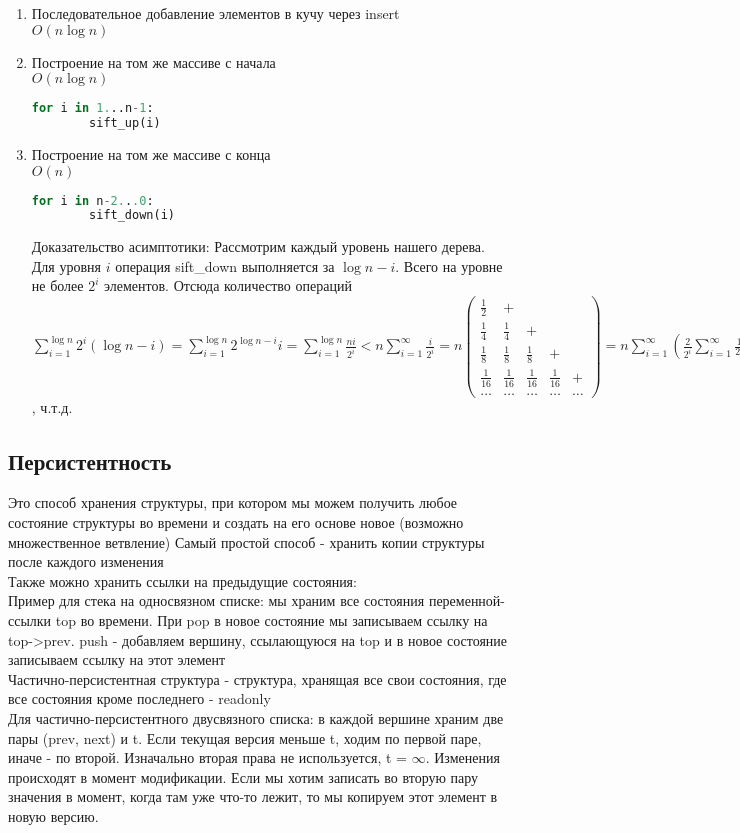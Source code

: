 \documentclass[12pt]{article}
\begin{document}
\begin{enumerate}
    \item Последовательное добавление элементов в кучу через insert\\
    $O(n\log n)$
    \item Построение на том же массиве с начала\\
    $O(n\log n)$
\begin{lstlisting}[language=Python]
    for i in 1...n-1:
        sift_up(i)
\end{lstlisting}
    \item Построение на том же массиве с конца\\
    $O(n)$
\begin{lstlisting}[language=Python]
    for i in n-2...0:
        sift_down(i)
\end{lstlisting}
Доказательство асимптотики:
Рассмотрим каждый уровень нашего дерева. Для уровня $i$ операция sift\_down выполняется за $\log n-i$. Всего на уровне не более $2^i$ элементов. Отсюда количество операций $\sum\limits_{i=1}^{\log n} 2^i(\log n - i) = \sum\limits_{i=1}^{\log n} 2^{\log n - i}i = \sum\limits_{i=1}^{\log n} \frac{ni}{2^i} < n\sum\limits_{i=1}^\infty \frac{i}{2^i} = n\left(\begin{array}{ccccc}
    \frac12 & + & & & \\
    \frac14 & \frac14 & + & & \\
    \frac18 & \frac18 & \frac18 & + & \\
    \frac1{16} & \frac1{16} & \frac1{16} & \frac1{16} & + \\
    \ldots & \ldots & \ldots & \ldots & \ldots
\end{array}\right) = n\sum\limits_{i=1}^\infty (\frac{2}{2^i} \sum\limits_{i=1}^\infty \frac1{2_i}) = n\sum\limits_{i=1}^\infty \frac{2}{2^i}\cdot 1 = 2n\cdot1$, ч.т.д.

\end{enumerate}
\subsection{Персистентность}
Это способ хранения структуры, при котором мы можем получить любое состояние структуры во времени и создать на его основе новое (возможно множественное ветвление)
Самый простой способ - хранить копии структуры после каждого изменения\\
Также можно хранить ссылки на предыдущие состояния:\\
Пример для стека на односвязном списке: мы храним все состояния переменной-ссылки top во времени. При pop в новое состояние мы записываем ссылку на top->prev. push - добавляем вершину, ссылающуюся на top и в новое состояние записываем ссылку на этот элемент\\
Частично-персистентная структура - структура, хранящая все свои состояния, где все состояния кроме последнего - readonly\\
Для частично-персистентного двусвязного списка: в каждой вершине храним две пары (prev, next) и t. Если текущая версия меньше t, ходим по первой паре, иначе - по второй. Изначально вторая права не используется, t = $\infty$. Изменения происходят в момент модификации. Если мы хотим записать во вторую пару значения в момент, когда там уже что-то лежит, то мы копируем этот элемент в новую версию.
\end{document}

